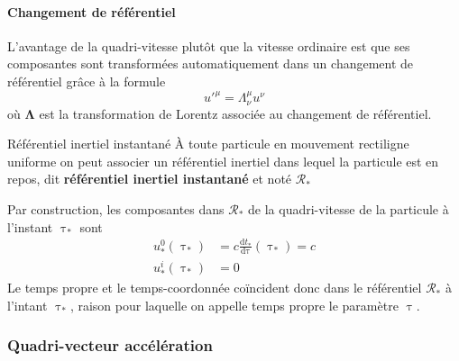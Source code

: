             \paragraph{Changement de référentiel}

            L’avantage de la quadri-vitesse plutôt que la vitesse ordinaire est que ses composantes sont transformées automatiquement dans un changement de référentiel grâce à la formule 
            \[ u'^{\mu} = \Lambda_{\nu}^{\mu} u^{\nu} \]   
            où $\symbf{\Lambda}$ est la transformation de Lorentz associée au changement de référentiel.

            \begin{omed}{Référentiel inertiel instantané}
                À toute particule en mouvement rectiligne uniforme on peut associer un référentiel inertiel dans lequel la particule est en repos, dit \textbf{référentiel inertiel instantané} et noté $\mathcal{R}_*$
            \end{omed}

            Par construction, les composantes dans $\mathcal{R}_*$ de la quadri-vitesse de la particule à l’instant $\uptau_*$ sont
            \begin{align*}
                u^0_*(\uptau_*) &= c \frac{\text{d}t_*}{\text{d}\uptau}(\uptau_*) = c \\
                u^{i}_*(\uptau_*) &= 0 
            \end{align*}
            Le temps propre et le temps-coordonnée coïncident donc dans le référentiel $\mathcal{R}_*$ à l’intant $\uptau_*$, raison pour laquelle on appelle temps propre le paramètre $\uptau$.

            
 
        \subsubsection{Quadri-vecteur accélération}


        


        
